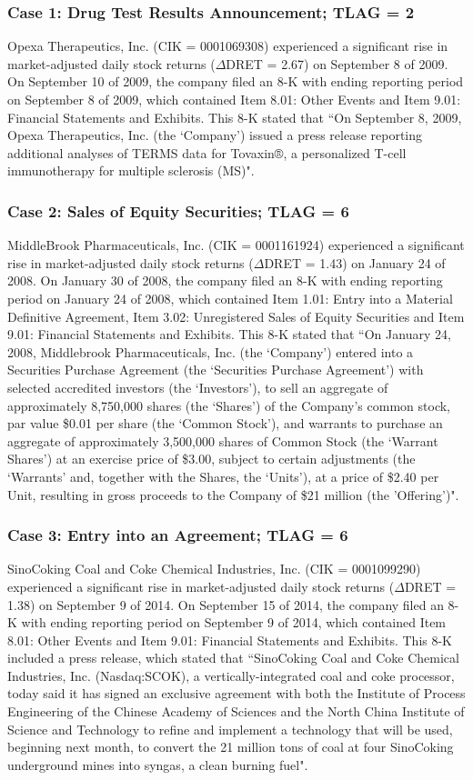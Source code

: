 \subsubsection*{Case 1: Drug Test Results Announcement; TLAG = 2}
Opexa Therapeutics, Inc. (CIK = 0001069308) experienced a significant rise in market-adjusted daily stock returns ($\Delta$DRET = 2.67) on September 8 of 2009. On September 10 of 2009, the company filed an 8-K with ending reporting period on September 8 of 2009, which contained Item 8.01: Other Events and Item 9.01: Financial Statements and Exhibits. This 8-K stated that ``On September 8, 2009, Opexa Therapeutics, Inc. (the `Company') issued a press release reporting additional analyses of TERMS data for Tovaxin®, a personalized T-cell immunotherapy for multiple sclerosis (MS)". 
\subsubsection*{Case 2: Sales of Equity Securities; TLAG = 6}
MiddleBrook Pharmaceuticals, Inc. (CIK = 0001161924) experienced a significant rise in market-adjusted daily stock returns ($\Delta$DRET = 1.43) on January 24 of 2008. On January 30 of 2008, the company filed an 8-K with ending reporting period on January 24 of 2008, which contained Item 1.01: Entry into a Material Definitive Agreement, Item 3.02: Unregistered Sales of Equity Securities and Item 9.01: Financial Statements and Exhibits. This 8-K stated that ``On January 24, 2008, Middlebrook Pharmaceuticals, Inc. (the `Company') entered into a Securities Purchase Agreement (the `Securities Purchase Agreement') with selected accredited investors (the `Investors'), to sell an aggregate of approximately 8,750,000 shares (the `Shares') of the Company’s common stock, par value \$0.01 per share (the `Common Stock'), and warrants to purchase an aggregate of approximately 3,500,000 shares of Common Stock (the `Warrant Shares') at an exercise price of \$3.00, subject to certain adjustments (the `Warrants' and, together with the Shares, the `Units'), at a price of \$2.40 per Unit, resulting in gross proceeds to the Company of \$21 million (the 'Offering')".
\subsubsection*{Case 3: Entry into an Agreement; TLAG = 6}
SinoCoking Coal and Coke Chemical Industries, Inc. (CIK = 0001099290) experienced a significant rise in market-adjusted daily stock returns ($\Delta$DRET = 1.38) on September 9 of 2014. On September 15 of 2014, the company filed an 8-K with ending reporting period on September 9 of 2014, which contained Item 8.01: Other Events and Item 9.01: Financial Statements and Exhibits. This 8-K included a press release, which stated that ``SinoCoking Coal and Coke Chemical Industries, Inc. (Nasdaq:SCOK), a vertically-integrated coal and coke processor, today said it has signed an exclusive agreement with both the Institute of Process Engineering of the Chinese Academy of Sciences and the North China Institute of Science and Technology to refine and implement a technology that will be used, beginning next month, to convert the 21 million tons of coal at four SinoCoking underground mines into syngas, a clean burning fuel".
